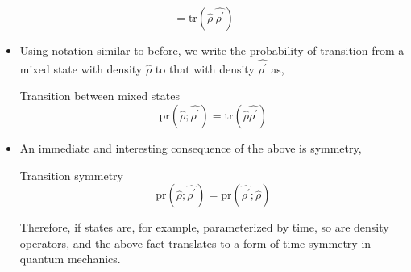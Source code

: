 \documentclass[9pt,handout]{beamer}
\newcommand{\pr}[0]{\text{pr}}
\newcommand{\tr}[0]{\text{tr}}
\begin{document}
\begin{frame}{}
$$ = \tr \left( \widehat{\rho} \: \widehat{\rho^\prime} \right)$$

\begin{itemize}
\item Using notation similar to before, we write the probability of transition from a mixed state with density $\widehat{\rho}$ to that with density $\widehat{\rho^\prime}$ as,

\begin{block}{Transition between mixed states}
$$\pr \left( \widehat{\rho}; \widehat{\rho^\prime} \right) = \tr \left( \widehat{\rho} \widehat{\rho^\prime} \right)$$
\end{block}

\item An immediate and interesting consequence of the above is symmetry,

\begin{block}{Transition symmetry}
$$\pr \left( \widehat{\rho}; \widehat{\rho^\prime} \right) = \pr \left( \widehat{\rho^\prime}; \widehat{\rho} \right)$$
\end{block}

Therefore, if states are, for example, parameterized by time, so are density operators, and the above fact translates to a form of time symmetry in quantum mechanics.
\end{itemize}
\end{frame}
\end{document}
